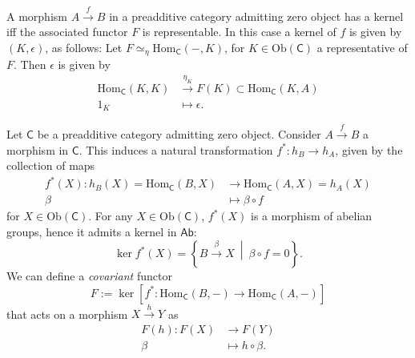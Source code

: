 \begin{prop}
	A morphism $A \xrightarrow{f} B$ in a preadditive category admitting zero object has a kernel iff the associated functor $F$ is representable.
	In this case a kernel of $f$ is given by $\left(K, \epsilon\right)$, as follows:
	Let $F \simeq_\eta \mathrm{Hom}_{\mathsf{C}} \left( -, K \right)$, for $K \in \mathrm{Ob} \left(\mathsf{C}\right)$ a representative of $F$.
	Then $\epsilon$ is given by
	\begin{align}
		\mathrm{Hom}_{\mathsf{C}} \left( K, K \right) &\xrightarrow{\eta_K} F(K) 
		\subset \mathrm{Hom}_{\mathsf{C}} \left( K, A \right)\\
		1_K &\mapsto \epsilon
	.\end{align} 
\end{prop} 

\begin{defn}
	Let $\mathsf{C}$ be a preadditive category admitting zero object.
	Consider $A \xrightarrow{f} B$ a morphism in $\mathsf{C}$.
	This induces a natural transformation
	$f^*\colon h_B \to h_A$, given by the collection of maps
	\begin{align}
		f^*(X): h_B(X) = \mathrm{Hom}_{\mathsf{C}} \left( B, X \right) &\to
		\mathrm{Hom}_{\mathsf{C}} \left( A, X \right) = h_A(X) \\
		\beta &\mapsto \beta \circ f
	\end{align} 
	for $X \in \mathrm{Ob} \left(\mathsf{C}\right)$.
	For any $X \in \mathrm{Ob} \left(\mathsf{C}\right)$, $f^*(X)$ is a morphism of abelian groups, hence it admits a kernel in $\mathsf{Ab}$:
	\begin{equation}
		\ker f^*(X) = \left\{ B \xrightarrow{\beta} X \ \middle|\ \beta \circ f = 0 \right\}
	.\end{equation} 
	We can define a \textit{covariant} functor
	\begin{equation}
	F := \ker \left[ f^*: \mathrm{Hom}_{\mathsf{C}} \left( B, - \right) \to \mathrm{Hom}_{\mathsf{C}} \left( A, - \right) \right]
	\end{equation} 
	that acts on a morphism $X \xrightarrow{h} Y$ as
	\begin{align}
		F(h): F(X) &\to F(Y) \\
		\beta &\mapsto h \circ \beta
	.\end{align} 
\end{defn}

